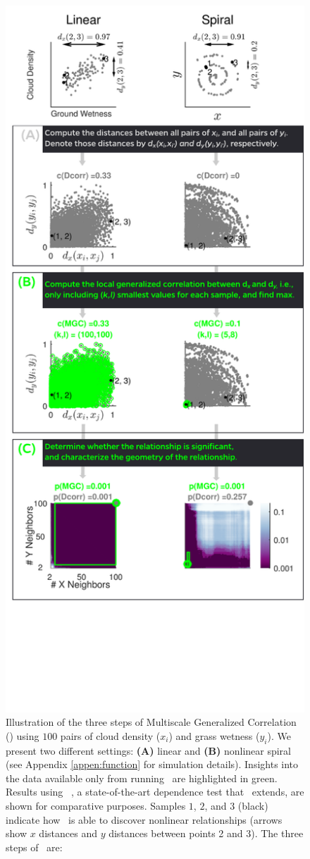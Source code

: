 \documentclass[11pt]{article}
\begin{document}
\begin{figure}
\includegraphics[width=0.5\linewidth]{Figures/Fig1All}
\caption{
Illustration of the three steps of Multiscale Generalized Correlation (\Mgc)  using  $100$ pairs of cloud density ($x_i$) and grass wetness ($y_i$). 
We present two different settings: \textbf{(A)} linear  and \textbf{(B)} nonlinear spiral  (see Appendix \ref{appen:function} for simulation details). 
Insights into the data available only from running \Mgc~are highlighted in {\color{green}green.}  Results using \Dcorr~\cite{SzekelyRizzo2009}, a state-of-the-art dependence test that \Mgc~extends, are shown for comparative purposes. 
% 
Samples $1$, $2$, and $3$ (black) indicate how \Mgc~is able to discover nonlinear relationships (arrows show $x$ distances and $y$ distances between points 2 and 3). 
% 
The three steps of \Mgc~are:
}
\end{figure}
\end{document}
